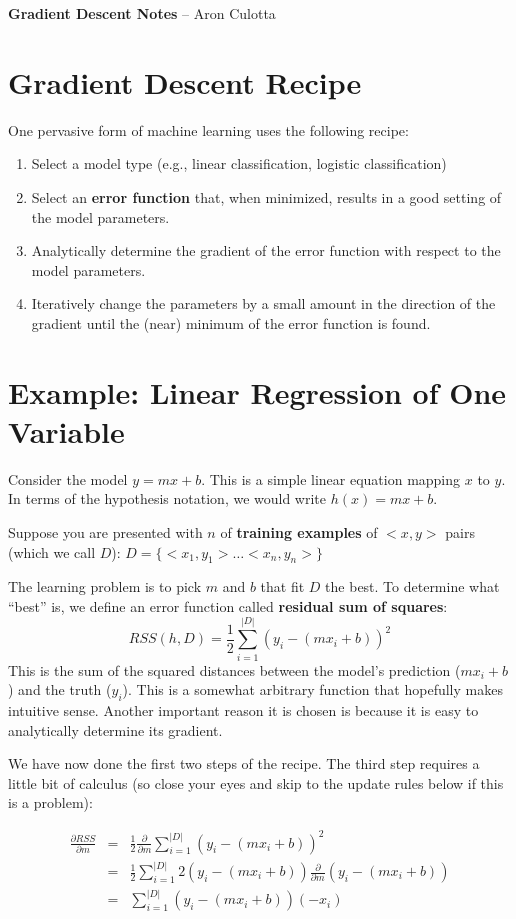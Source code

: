 \documentclass{article}
\begin{document}
\Large{\bf Gradient Descent Notes}  -- Aron Culotta
\normalsize

\section{Gradient Descent Recipe}
One pervasive form of machine learning uses the following recipe:
\begin{enumerate}
\item Select a model type (e.g., linear classification, logistic classification)
\item Select an {\bf error function} that, when minimized, results in a good setting of the model parameters.
\item Analytically determine the gradient of the error function with
  respect to the model parameters.
\item Iteratively change the parameters by a small amount in the
  direction of the gradient until the (near) minimum of the error
  function is found.
\end{enumerate}

\section{Example: Linear Regression of One Variable}
Consider the model $y = mx + b$. This is a simple linear equation
mapping $x$ to $y$. In terms of the hypothesis notation, we would
write $h(x) = mx + b$.

Suppose you are presented with $n$ of {\bf training examples} of
$<x,y>$ pairs (which we call $D$):
$D = \{<x_1,y_1> \ldots <x_n,y_n>\}$

The learning problem is to pick $m$ and $b$ that fit $D$ the best. To determine what ``best'' is, we define an error function called {\bf residual sum of squares}:
$$
RSS(h, D) = \frac{1}{2}\sum_{i=1}^{|D|} (y_i - (mx_i + b))^2
$$ This is the sum of the squared distances between the model's
prediction ($mx_i + b$) and the truth ($y_i$). This is a somewhat
arbitrary function that hopefully makes intuitive sense. Another
important reason it is chosen is because it is easy to analytically
determine its gradient.

We have now done the first two steps of the recipe. The third step requires a little bit of calculus (so close your eyes and skip to the update rules below if this is a problem):

\begin{eqnarray*}
\frac{\partial RSS }{\partial m} & = &  \frac{1}{2}\frac{\partial }{\partial m}  \sum_{i=1}^{|D|} (y_i - (mx_i + b))^2\\
& = & \frac{1}{2} \sum_{i=1}^{|D|} 2(y_i - (mx_i + b)) \frac{\partial}{\partial m} (y_i - (mx_i + b))\\
& = & \sum_{i=1}^{|D|}(y_i - (mx_i + b))(-x_i)
\end{eqnarray*}
\end{document}
